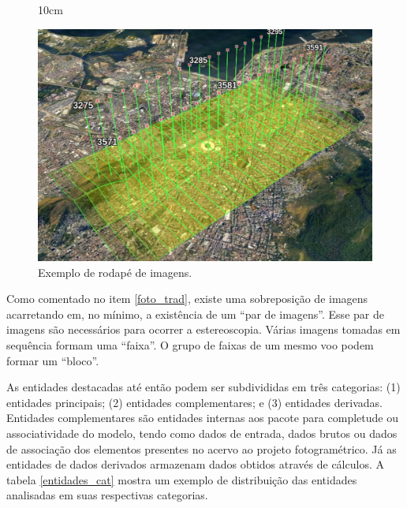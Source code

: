 \begin{figure}[!ht]{10cm}
  \caption{Exemplo de rodapé de imagens.} \label{foot}
  \centering
  \includegraphics[width=1\hsize]{figuras/footprint.jpg}
\end{figure}

Como comentado no item \ref{foto_trad}, existe uma sobreposição de imagens acarretando em, no mínimo, a existência de um ``par de imagens''. Esse par de imagens são necessários para ocorrer a estereoscopia. Várias imagens tomadas em sequência formam uma ``faixa''. O grupo de faixas de um mesmo voo podem formar um ``bloco''.

As entidades destacadas até então podem ser subdivididas em três categorias: (1) entidades principais; (2) entidades complementares; e (3) entidades derivadas. Entidades complementares são entidades internas aos pacote para completude ou associatividade do modelo, tendo como dados de entrada, dados brutos ou dados de associação dos elementos presentes no acervo ao projeto fotogramétrico. Já as entidades de dados derivados armazenam dados obtidos através de cálculos. A tabela \ref{entidades_cat} mostra um exemplo de distribuição das entidades analisadas em suas respectivas categorias.

